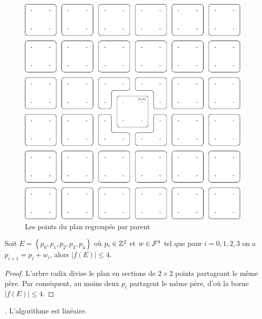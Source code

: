 \begin{figure}
\centering
\includegraphics{figures/etendu-au-plan.pdf}\caption{Les points du plan regroupés par parent}
\end{figure}

\begin{lemma}\label{lemme-moins-de-peres}
Soit $E=\left\{p_0, p_1, p_2, p_3, p_4\right\}$ où $p_i \in \mathbb{Z}^2$ et $w \in \mathcal{F}^4$ tel que pour $i=0,1,2,3$ on a $p_{i+1} = p_{i} + w_i$, alors $\left|f(E)\right| \leq 4$.
\end{lemma}
\begin{proof}
L'arbre radix divise le plan en sections de $2\times2$ points partageant le même père. Par conséquent, au moins deux $p_i$ partagent le même père, d'où la borne $|f(E)| \leq 4$.
\end{proof}

\begin{theorem}\emph{\cite{BKP}.}
L'algorithme \parcours est linéaire.
\end{theorem}

